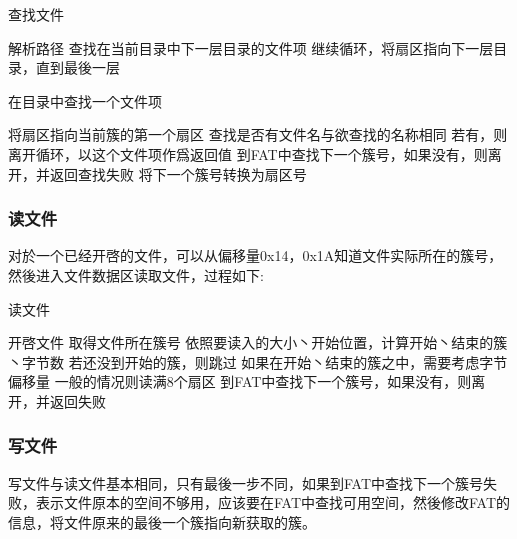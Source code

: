 \begin{algorithm}[H]
	\caption{查找文件}
	\begin{algorithmic}[1]
      \State 解析路径
        \State 查找在当前目录中下一层目录的文件项
        \State 继续循环，将扇区指向下一层目录，直到最後一层
      \EndFor
		\EndFunction
	\end{algorithmic}
\end{algorithm}

\begin{algorithm}[H]
	\caption{在目录中查找一个文件项}
	\begin{algorithmic}[1]
      \State 将扇区指向当前簇的第一个扇区
        \State 查找是否有文件名与欲查找的名称相同
        \State 若有，则离开循环，以这个文件项作爲返回值
        \State 到FAT中查找下一个簇号，如果没有，则离开，并返回查找失败
        \State 将下一个簇号转换为扇区号
      \EndFor
		\EndFunction
	\end{algorithmic}
\end{algorithm}


\subsubsection{读文件}

对於一个已经开啓的文件，可以从偏移量0x14，0x1A知道文件实际所在的簇号，然後进入文件数据区读取文件，过程如下: 


\begin{algorithm}[H]
	\caption{读文件}
	\begin{algorithmic}[1]
      \State 开啓文件
      \State 取得文件所在簇号
      \State 依照要读入的大小丶开始位置，计算开始丶结束的簇丶字节数
        \State 若还没到开始的簇，则跳过
        \State 如果在开始丶结束的簇之中，需要考虑字节偏移量
        \State 一般的情况则读满8个扇区
        \State 到FAT中查找下一个簇号，如果没有，则离开，并返回失败
      \EndFor
		\EndFunction
	\end{algorithmic}
\end{algorithm}


\subsubsection{写文件}

写文件与读文件基本相同，只有最後一步不同，如果到FAT中查找下一个簇号失败，表示文件原本的空间不够用，应该要在FAT中查找可用空间，然後修改FAT的信息，将文件原来的最後一个簇指向新获取的簇。



